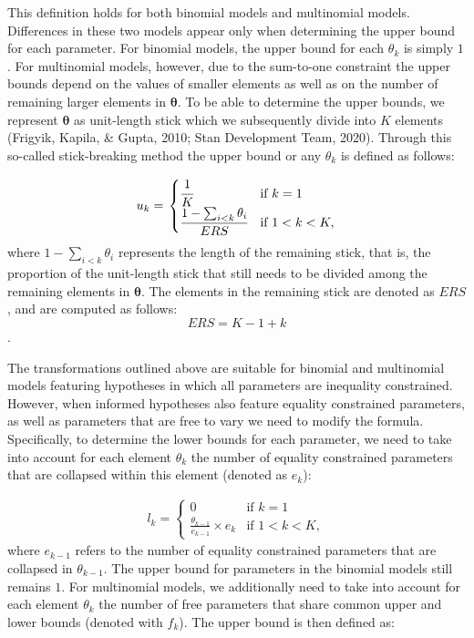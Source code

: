 \documentclass[
  english,
  man,floatsintext]{apa6}
\begin{document}
\begin{appendix}
This definition holds for both binomial models and multinomial models.
Differences in these two models appear only when determining the upper
bound for each parameter. For binomial models, the upper bound for each
\(\theta_k\) is simply \(1\). For multinomial models, however, due to
the sum-to-one constraint the upper bounds depend on the values of
smaller elements as well as on the number of remaining larger elements
in \(\boldsymbol{\theta}\). To be able to determine the upper bounds, we
represent \(\boldsymbol{\theta}\) as unit-length stick which we
subsequently divide into \(K\) elements (Frigyik, Kapila, \& Gupta,
2010; Stan Development Team, 2020). Through this so-called
stick-breaking method the upper bound or any \(\theta_k\) is defined as
follows:

\begin{align}
\label{Eq:upperBound}
u_k = \left.
\begin{cases}
\cfrac{1}{K} & \text{if } k = 1 \\
\cfrac{1 - \sum_{i < k} \theta_i}{ERS} & \text{if } 1 < k < K,
\end{cases}
\right.
\end{align} where \(1 - \sum_{i < k} \theta_i\) represents the length of
the remaining stick, that is, the proportion of the unit-length stick
that still needs to be divided among the remaining elements in
\(\boldsymbol{\theta}\). The elements in the remaining stick are denoted
as \(ERS\), and are computed as follows: \[ERS = K - 1 + k\].

The transformations outlined above are suitable for binomial and
multinomial models featuring hypotheses in which all parameters are
inequality constrained. However, when informed hypotheses also feature
equality constrained parameters, as well as parameters that are free to
vary we need to modify the formula. Specifically, to determine the lower
bounds for each parameter, we need to take into account for each element
\(\theta_k\) the number of equality constrained parameters that are
collapsed within this element (denoted as \(e_k\)):

\begin{align}
l_k = \left.
\begin{cases}
0 & \text{if } k = 1 \\
\frac{\theta_{k - 1}}{e_{k-1}} \times e_k & \text{if } 1 < k < K,
\end{cases}
\right.
\end{align} where \(e_{k-1}\) refers to the number of equality
constrained parameters that are collapsed in \(\theta_{k - 1}\). The
upper bound for parameters in the binomial models still remains \(1\).
For multinomial models, we additionally need to take into account for
each element \(\theta_k\) the number of free parameters that share
common upper and lower bounds (denoted with \(f_k\)). The upper bound is
then defined as:


\end{appendix}
\end{document}
